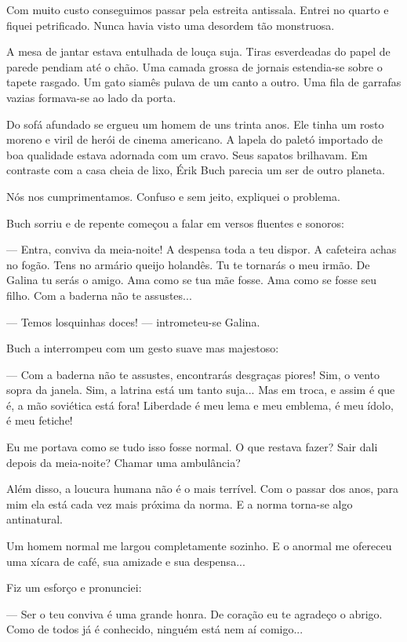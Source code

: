 Com muito custo conseguimos passar pela estreita antissala. Entrei no
quarto e fiquei petrificado. Nunca havia visto uma desordem tão
monstruosa.

A mesa de jantar estava entulhada de louça suja. Tiras esverdeadas do
papel de parede pendiam até o chão. Uma camada grossa de jornais
estendia-se sobre o tapete rasgado. Um gato siamês pulava de um canto a
outro. Uma fila de garrafas vazias formava-se ao lado da porta.

Do sofá afundado se ergueu um homem de uns trinta anos. Ele tinha um
rosto moreno e viril de herói de cinema americano. A lapela do paletó
importado de boa qualidade estava adornada com um cravo. Seus sapatos
brilhavam. Em contraste com a casa cheia de lixo, Érik Buch parecia um
ser de outro planeta.

Nós nos cumprimentamos. Confuso e sem jeito, expliquei o problema.

Buch sorriu e de repente começou a falar em versos fluentes e sonoros:

--- Entra, conviva da meia-noite! A despensa toda a teu dispor. A
cafeteira achas no fogão. Tens no armário queijo holandês. Tu te
tornarás o meu irmão. De Galina tu serás o amigo. Ama como se tua mãe
fosse. Ama como se fosse seu filho. Com a baderna não te assustes...

--- Temos losquinhas doces! --- intrometeu-se Galina.

Buch a interrompeu com um gesto suave mas majestoso:

--- Com a baderna não te assustes, encontrarás desgraças piores! Sim, o
vento sopra da janela. Sim, a latrina está um tanto suja... Mas em
troca, e assim é que é, a mão soviética está fora! Liberdade é meu lema
e meu emblema, é meu ídolo, é meu fetiche!

Eu me portava como se tudo isso fosse normal. O que restava fazer? Sair
dali depois da meia-noite? Chamar uma ambulância?

Além disso, a loucura humana não é o mais terrível. Com o passar dos
anos, para mim ela está cada vez mais próxima da norma. E a norma
torna-se algo antinatural.

Um homem normal me largou completamente sozinho. E o anormal me ofereceu
uma xícara de café, sua amizade e sua despensa...

Fiz um esforço e pronunciei:

--- Ser o teu conviva é uma grande honra. De coração eu te agradeço o
abrigo. Como de todos já é conhecido, ninguém está nem aí comigo...

